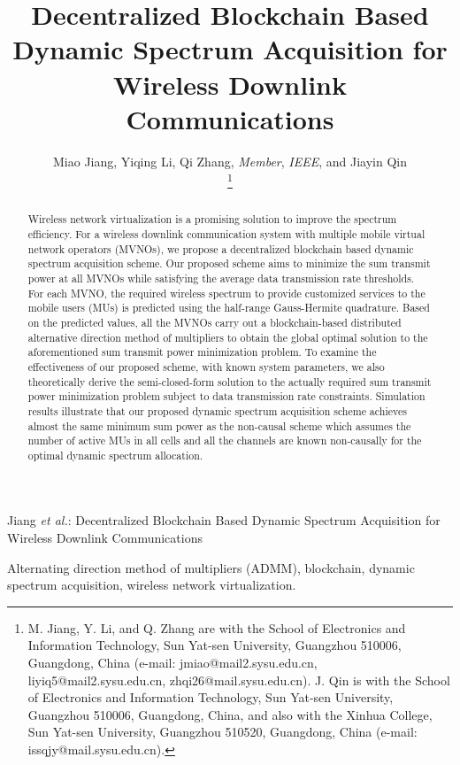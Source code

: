 \documentclass[journal]{IEEEtran}
\begin{document}
	
\title{Decentralized Blockchain Based Dynamic Spectrum Acquisition for Wireless Downlink Communications}
	
\author{Miao Jiang, Yiqing Li, Qi Zhang, \emph{Member}, \emph{IEEE}, and Jiayin Qin

\thanks{M. Jiang, Y. Li, and Q. Zhang are with the School of Electronics and Information Technology, Sun Yat-sen University, Guangzhou 510006, Guangdong, China (e-mail: jmiao@mail2.sysu.edu.cn, liyiq5@mail2.sysu.edu.cn, zhqi26@mail.sysu.edu.cn). J. Qin is with the School of Electronics and
Information Technology, Sun Yat-sen University, Guangzhou 510006, Guangdong,  China, and also with the Xinhua College, Sun Yat-sen University, Guangzhou 510520, Guangdong, China (e-mail: issqjy@mail.sysu.edu.cn).}
}%
	
	
\markboth{}
{Jiang \MakeLowercase{\textit{et al.}}: Decentralized Blockchain Based Dynamic Spectrum Acquisition for Wireless Downlink Communications}
	
\maketitle
\begin{abstract}
Wireless network virtualization is a promising solution to improve the spectrum efficiency. For a wireless downlink communication system with multiple mobile virtual network operators (MVNOs), we propose a decentralized blockchain based dynamic spectrum acquisition scheme. Our proposed scheme aims to minimize the sum transmit power at all MVNOs while satisfying the average data transmission rate thresholds. For each MVNO,
the required wireless spectrum to provide customized services to the mobile users (MUs) is predicted using the half-range Gauss-Hermite quadrature. Based on the predicted values, all the MVNOs carry out a blockchain-based distributed alternative direction method of multipliers to obtain the global optimal solution to the aforementioned sum transmit power minimization problem. To examine the effectiveness of our proposed scheme, with known system parameters, we also theoretically derive the semi-closed-form solution to the {\color{red} actually} required sum transmit power minimization problem subject to data transmission rate constraints. Simulation results illustrate that our proposed dynamic spectrum acquisition scheme achieves almost the same minimum sum power as the non-causal scheme which assumes the number of active MUs in all cells and all the channels are known non-causally for the optimal dynamic spectrum allocation.
\end{abstract}
\begin{IEEEkeywords}
Alternating direction method of multipliers (ADMM), blockchain, dynamic spectrum acquisition, wireless network virtualization.
\end{IEEEkeywords}
\IEEEpeerreviewmaketitle
	
\end{document}
